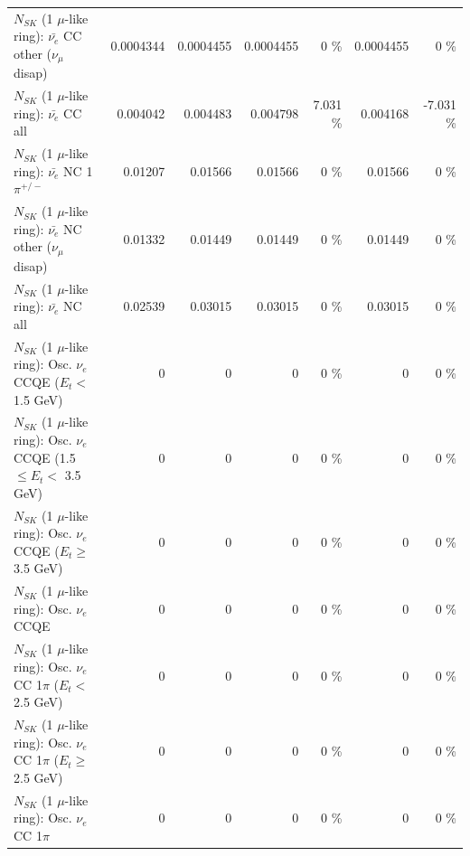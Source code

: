 \begin{table}
\begin{tabular}{| l | r | r | r  r | r  r |}
          $N_{SK}$ (1 $\mu$-like ring): $\bar{\nu_e}$ CC other ($\nu_\mu$ disap) &       0.0004344 &       0.0004455 &       0.0004455 &        0 \%  &       0.0004455 &        0 \%  \\ 
                            $N_{SK}$ (1 $\mu$-like ring): $\bar{\nu_{e}}$ CC all &        0.004042 &        0.004483 &        0.004798 &    7.031 \%  &        0.004168 &   -7.031 \%  \\ 
\hline
                     $N_{SK}$ (1 $\mu$-like ring): $\bar{\nu_e}$ NC 1$\pi^{+/-}$ &         0.01207 &         0.01566 &         0.01566 &        0 \%  &         0.01566 &        0 \%  \\ 
          $N_{SK}$ (1 $\mu$-like ring): $\bar{\nu_e}$ NC other ($\nu_\mu$ disap) &         0.01332 &         0.01449 &         0.01449 &        0 \%  &         0.01449 &        0 \%  \\ 
                            $N_{SK}$ (1 $\mu$-like ring): $\bar{\nu_{e}}$ NC all &         0.02539 &         0.03015 &         0.03015 &        0 \%  &         0.03015 &        0 \%  \\ 
\hline
\hline
\hline
             $N_{SK}$ (1 $\mu$-like ring): Osc. $\nu_e$ CCQE ($E_{t} <$ 1.5 GeV) &               0 &               0 &               0 &        0 \%  &               0 &        0 \%  \\ 
    $N_{SK}$ (1 $\mu$-like ring): Osc. $\nu_e$ CCQE (1.5 $\leq E_{t} <$ 3.5 GeV) &               0 &               0 &               0 &        0 \%  &               0 &        0 \%  \\ 
          $N_{SK}$ (1 $\mu$-like ring): Osc. $\nu_e$ CCQE ($E_{t} \geq$ 3.5 GeV) &               0 &               0 &               0 &        0 \%  &               0 &        0 \%  \\ 
\hline
                                 $N_{SK}$ (1 $\mu$-like ring): Osc. $\nu_e$ CCQE &               0 &               0 &               0 &        0 \%  &               0 &        0 \%  \\ 
\hline
        $N_{SK}$ (1 $\mu$-like ring): Osc. $\nu_e$ CC 1$\pi$ ($E_{t} <$ 2.5 GeV) &               0 &               0 &               0 &        0 \%  &               0 &        0 \%  \\ 
     $N_{SK}$ (1 $\mu$-like ring): Osc. $\nu_e$ CC 1$\pi$ ($E_{t} \geq$ 2.5 GeV) &               0 &               0 &               0 &        0 \%  &               0 &        0 \%  \\ 
\hline
                            $N_{SK}$ (1 $\mu$-like ring): Osc. $\nu_e$ CC 1$\pi$ &               0 &               0 &               0 &        0 \%  &               0 &        0 \%  \\ 

\end{tabular}
\end{table}
